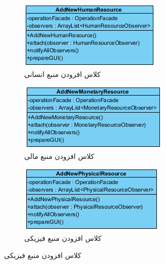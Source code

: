 \begin{figure}[H]
	\centering
	\begin{subfigure}[b]{0.3\textwidth}
		\includegraphics[width=\textwidth]{img/class-design/ui/AddNewHumanResource}
		\caption{کلاس افزودن منبع انسانی}
	\end{subfigure}
\hfill
	\begin{subfigure}[b]{0.3\textwidth}
		\includegraphics[width=\textwidth]{img/class-design/ui/AddNewMonetaryResource}
		\caption{کلاس افزودن منبع مالی}
	\end{subfigure}
	\hfill
	\begin{subfigure}[b]{0.3\textwidth}
		\includegraphics[width=\textwidth]{img/class-design/ui/AddNewPhysicalResource}
		\caption{کلاس افزودن منبع فیزیکی}

\end{subfigure}
\end{figure}
